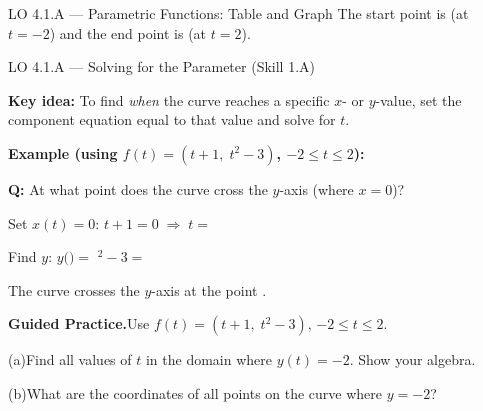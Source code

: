 \documentclass[10pt]{article}
\begin{document}
\begin{notesbox}{LO 4.1.A --- Parametric Functions: Table and Graph}
\vspace{4pt}
The start point is \underline{\hspace{2.5cm}} (at $t = -2$) and the
end point is \underline{\hspace{2.5cm}} (at $t = 2$).

\end{notesbox}

\vspace{0.08in}

\begin{notesbox}{LO 4.1.A --- Solving for the Parameter (Skill 1.A)}

\textbf{Key idea:} To find \emph{when} the curve reaches a specific
$x$- or $y$-value, set the component equation equal to that value and
solve for $t$.

\vspace{8pt}
\textbf{Example (using $f(t) = (t+1,\; t^2-3)$, $-2 \le t \le 2$):}

\vspace{4pt}
\textbf{Q:} At what point does the curve cross the $y$-axis
(where $x = 0$)?

Set $x(t) = 0$: \quad $t + 1 = 0 \;\Rightarrow\; t = $ \blank{1.2cm}

Find $y$: \quad $y\bigl($\blank{1cm}$\bigr) = $ \blank{1cm}${}^2 - 3 = $ \blank{1.5cm}

The curve crosses the $y$-axis at the point \blank{2.5cm}.

\vspace{10pt}
\textbf{Guided Practice.}\quad Use $f(t) = (t+1,\; t^2-3)$,
$-2 \le t \le 2$.

\vspace{4pt}
(a)\quad Find all values of $t$ in the domain where $y(t) = -2$.
Show your algebra.

(b)\quad What are the coordinates of all points on the curve where
$y = -2$?
\writeline

\end{notesbox}

\vspace{0.08in}
\end{document}
